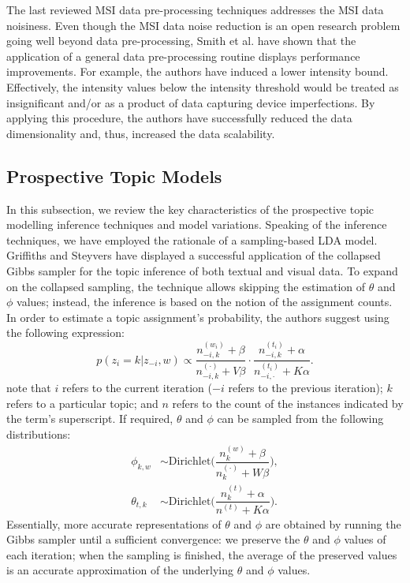 \documentclass{mpaper}
\begin{document}
\par The last reviewed MSI data pre-processing techniques addresses the MSI data noisiness. Even though the MSI data noise reduction is an open research problem going well beyond data pre-processing, Smith et al. \cite{smith2014proteomics} have shown that the application of a general data pre-processing routine displays performance improvements. For example, the authors have induced a lower intensity bound. Effectively, the intensity values below the intensity threshold would be treated as insignificant and/or as a product of data capturing device imperfections. By applying this procedure, the authors have successfully reduced the data dimensionality and, thus, increased the data scalability.

\subsection{Prospective Topic Models}

\par In this subsection, we review the key characteristics of the prospective topic modelling inference techniques and model variations. Speaking of the inference techniques, we have employed the rationale of a sampling-based LDA model. Griffiths and Steyvers \cite{griffiths2004finding} have displayed a successful application of the collapsed Gibbs sampler for the topic inference of both textual and visual data. To expand on the collapsed sampling, the technique allows skipping the estimation of $\theta$ and $\phi$ values; instead, the inference is based on the notion of the assignment counts. In order to estimate a topic assignment's probability, the authors suggest using the following expression:
\begin{equation*}
p(z_i = k | z_{-i}, w) \propto \dfrac{n_{-i, k}^{(w_i)} + \beta}{n_{-i, k}^{(\cdot)} + V\beta}\cdot \dfrac{n_{-i, k}^{(t_i)} + \alpha}{n_{-i, \cdot}^{(t_i)} + K\alpha}.
\end{equation*}
note that $i$ refers to the current iteration ($-i$ refers to the previous iteration); $k$ refers to a particular topic; and $n$ refers to the count of the instances indicated by the term's superscript. If required, $\theta$ and $\phi$ can be sampled from the following distributions:
\begin{align*}
\phi_{k,w} & \sim \mbox{Dirichlet}\bigg(\dfrac{n_{k}^{(w)} + \beta}{n_{k}^{(\cdot)} + W\beta}\bigg),\\
\theta_{t,k} & \sim \mbox{Dirichlet}\bigg(\dfrac{n_{k}^{(t)} + \alpha}{n^{(t)} + K\alpha}\bigg).
\end{align*}
Essentially, more accurate representations of $\theta$ and $\phi$ are obtained by running the Gibbs sampler until a sufficient convergence: we preserve the $\theta$ and $\phi$ values of each iteration; when the sampling is finished, the average of the preserved values is an accurate approximation of the underlying $\theta$ and $\phi$ values.
\end{document}
